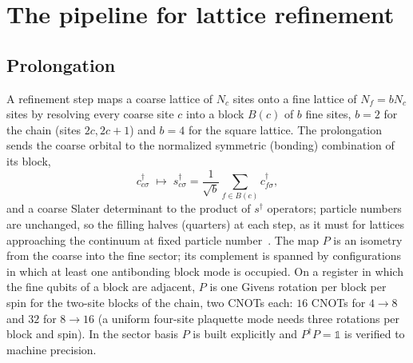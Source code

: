 \documentclass[a4paper,11pt,noarxiv]{quantumarticle}
\begin{document}
\section{The pipeline for lattice refinement}
\label{sec:pipeline}

\subsection{Prolongation}
\label{sec:prolong}
A refinement step maps a coarse lattice of $N_c$ sites onto a fine lattice of
$N_f=bN_c$ sites by resolving every coarse site $c$ into a block $B(c)$ of
$b$ fine sites, $b=2$ for the chain (sites $2c,2c+1$) and $b=4$ for the
square lattice.  The prolongation sends the coarse orbital to the normalized
symmetric (bonding) combination of its block,
\begin{equation}
  c^\dagger_{c\sigma}\;\longmapsto\;
  s^\dagger_{c\sigma}=\frac{1}{\sqrt b}\sum_{f\in B(c)}c^\dagger_{f\sigma},
  \label{eq:bonding}
\end{equation}
and a coarse Slater determinant to the product of $s^\dagger$ operators;
particle numbers are unchanged, so the filling halves (quarters) at each
step, as it must for lattices approaching the continuum at fixed particle
number~\cite{Bogner2026}.  The map $P$ is an isometry from the coarse into
the fine sector; its complement is spanned by configurations in which at
least one antibonding block mode is occupied.  On a register in which the
fine qubits of a block are adjacent, $P$ is one Givens rotation per block
per spin for the two-site blocks of the chain, two CNOTs each: $16$ CNOTs
for $4\to8$ and $32$ for $8\to16$ (a uniform four-site plaquette mode
needs three rotations per block and spin).  In
the sector basis $P$ is built explicitly and $P^\dagger P=\mathbb1$ is
verified to machine precision.
\end{document}
